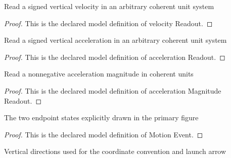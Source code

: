 \begin{definition}
  \label{def:physics:phyx-mini-0810:phyxminiproblems-problemphyxmini0810-velocityreadout}
  Read a signed vertical velocity in an arbitrary coherent unit system
\end{definition}
\begin{proof}
  This is the declared model definition of velocity Readout.
\end{proof}
\begin{definition}
  \label{def:physics:phyx-mini-0810:phyxminiproblems-problemphyxmini0810-accelerationreadout}
  Read a signed vertical acceleration in an arbitrary coherent unit system
\end{definition}
\begin{proof}
  This is the declared model definition of acceleration Readout.
\end{proof}
\begin{definition}
  \label{def:physics:phyx-mini-0810:phyxminiproblems-problemphyxmini0810-accelerationmagnitudereadout}
  Read a nonnegative acceleration magnitude in coherent units
\end{definition}
\begin{proof}
  This is the declared model definition of acceleration Magnitude Readout.
\end{proof}
\begin{definition}
  \label{def:physics:phyx-mini-0810:phyxminiproblems-problemphyxmini0810-motionevent}
  The two endpoint states explicitly drawn in the primary figure
\end{definition}
\begin{proof}
  This is the declared model definition of Motion Event.
\end{proof}
\begin{definition}
  \label{def:physics:phyx-mini-0810:phyxminiproblems-problemphyxmini0810-verticaldirection}
  Vertical directions used for the coordinate convention and launch arrow
\end{definition}
